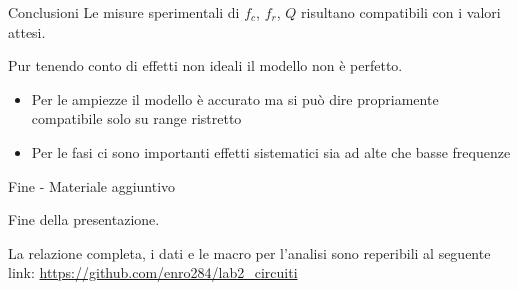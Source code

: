 \documentclass[italian]{beamer}
\begin{document}
\begin{frame}{Conclusioni}
    Le misure sperimentali di $f_c$, $f_r$, $Q$ risultano compatibili con i valori attesi.

    Pur tenendo conto di effetti non ideali il modello non è perfetto.
    \begin{itemize}
        \item Per le ampiezze il modello è accurato ma si può dire propriamente compatibile solo su range ristretto
        \item Per le fasi ci sono importanti effetti sistematici sia ad alte che basse frequenze
    \end{itemize}
\end{frame}

\begin{frame}[b]{Fine - Materiale aggiuntivo}
    \Large\centerline{Fine della presentazione.}

    \vspace{8em}
    
    \small
    La relazione completa, i dati e le macro per l'analisi sono reperibili al seguente link:
    \url{https://github.com/enro284/lab2_circuiti}
\end{frame}
\end{document}
